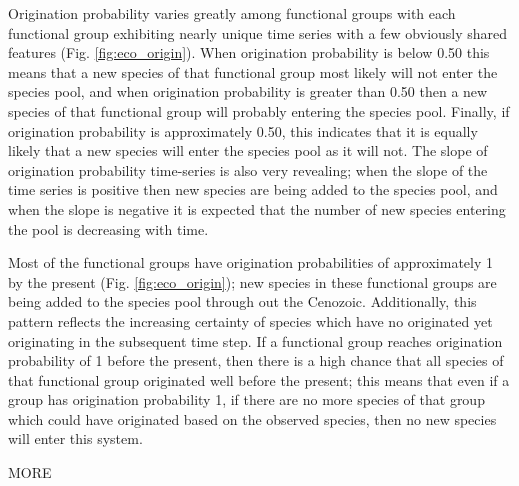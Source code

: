 \documentclass[12pt,letterpaper]{article}
\begin{document}
Origination probability varies greatly among functional groups with each functional group exhibiting nearly unique time series with a few obviously shared features (Fig. \ref{fig:eco_origin}). When origination probability is below 0.50 this means that a new species of that functional group most likely will not enter the species pool, and when origination probability is greater than 0.50 then a new species of that functional group will probably entering the species pool. Finally, if origination probability is approximately 0.50, this indicates that it is equally likely that a new species will enter the species pool as it will not. The slope of origination probability time-series is also very revealing; when the slope of the time series is positive then new species are being added to the species pool, and when the slope is negative it is expected that the number of new species entering the pool is decreasing with time. %

Most of the functional groups have origination probabilities of approximately 1 by the present (Fig. \ref{fig:eco_origin}); new species in these functional groups are being added to the species pool through out the Cenozoic. Additionally, this pattern reflects the increasing certainty of species which have no originated yet originating in the subsequent time step. If a functional group reaches origination probability of 1 before the present, then there is a high chance that all species of that functional group originated well before the present; this means that even if a group has origination probability 1, if there are no more species of that group which could have originated based on the observed species, then no new species will enter this system.

\uppercase{more}
\end{document}

